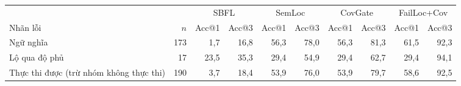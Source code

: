 \begin{tabular}{lrrrrrrrrr}
\toprule
 & & \multicolumn{2}{c}{SBFL} & \multicolumn{2}{c}{SemLoc} & \multicolumn{2}{c}{CovGate} & \multicolumn{2}{c}{FailLoc+Cov} \\
\cmidrule(lr){3-4}\cmidrule(lr){5-6}\cmidrule(lr){7-8}\cmidrule(lr){9-10}
Nhãn lỗi & $n$ & Acc@1 & Acc@3 & Acc@1 & Acc@3 & Acc@1 & Acc@3 & Acc@1 & Acc@3 \\
\midrule
Ngữ nghĩa & 173 & 1,7 & 16,8 & 56,3 & 78,0 & 56,3 & 81,3 & 61,5 & 92,3 \\
Lộ qua độ phủ & 17 & 23,5 & 35,3 & 29,4 & 54,9 & 29,4 & 62,7 & 29,4 & 94,1 \\
Thực thi được (trừ nhóm không thực thi) & 190 & 3,7 & 18,4 & 53,9 & 76,0 & 53,9 & 79,7 & 58,6 & 92,5 \\
\bottomrule
\end{tabular}
